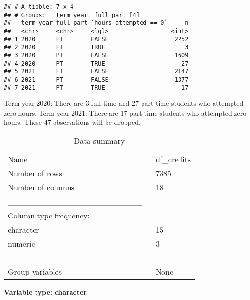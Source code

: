 \documentclass[]{article}
\newenvironment{Shaded}{\begin{snugshade}}{\end{snugshade}}
\newcommand{\CommentTok}[1]{\textcolor[rgb]{0.56,0.35,0.01}{\textit{#1}}}
\newcommand{\DecValTok}[1]{\textcolor[rgb]{0.00,0.00,0.81}{#1}}
\newcommand{\KeywordTok}[1]{\textcolor[rgb]{0.13,0.29,0.53}{\textbf{#1}}}
\newcommand{\NormalTok}[1]{#1}
\newcommand{\OperatorTok}[1]{\textcolor[rgb]{0.81,0.36,0.00}{\textbf{#1}}}
\newcommand{\StringTok}[1]{\textcolor[rgb]{0.31,0.60,0.02}{#1}}
\begin{document}
\begin{verbatim}
## # A tibble: 7 x 4
## # Groups:   term_year, full_part [4]
##   term_year full_part `hours_attempted == 0`     n
##   <chr>     <chr>     <lgl>                  <int>
## 1 2020      FT        FALSE                   2252
## 2 2020      FT        TRUE                       3
## 3 2020      PT        FALSE                   1609
## 4 2020      PT        TRUE                      27
## 5 2021      FT        FALSE                   2147
## 6 2021      PT        FALSE                   1377
## 7 2021      PT        TRUE                      17
\end{verbatim}

Term year 2020: There are 3 full time and 27 part time students who
attempted zero hours. Term year 2021: There are 17 part time students
who attempted zero hours. These 47 observations will be dropped.

\begin{Shaded}
\end{Shaded}

\begin{longtable}[]{@{}ll@{}}
\caption{Data summary}\tabularnewline
\toprule
\endhead
Name & df\_credits\tabularnewline
Number of rows & 7385\tabularnewline
Number of columns & 18\tabularnewline
\_\_\_\_\_\_\_\_\_\_\_\_\_\_\_\_\_\_\_\_\_\_\_ &\tabularnewline
Column type frequency: &\tabularnewline
character & 15\tabularnewline
numeric & 3\tabularnewline
\_\_\_\_\_\_\_\_\_\_\_\_\_\_\_\_\_\_\_\_\_\_\_\_ &\tabularnewline
Group variables & None\tabularnewline
\bottomrule
\end{longtable}

\textbf{Variable type: character}
\end{document}
